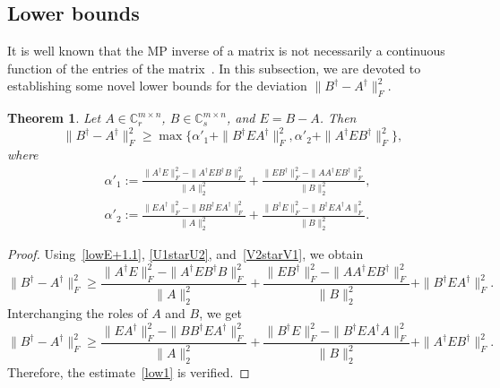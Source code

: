 \documentclass[11pt]{article}
\newtheorem{theorem}{Theorem}[section]
\begin{document}
\subsection{Lower bounds}

\label{subsec:lower}

It is well known that the MP inverse of a matrix is not necessarily a continuous function of the entries of the matrix~\cite{Stewart1969}. In this subsection, we are devoted to establishing some novel lower bounds for the deviation $\|B^{\dagger}-A^{\dagger}\|_{F}^{2}$.

\begin{theorem}\label{low-thm1}
Let $A\in\mathbb{C}^{m\times n}_{r}$, $B\in\mathbb{C}^{m\times n}_{s}$, and $E=B-A$. Then
\begin{equation}\label{low1}
\|B^{\dagger}-A^{\dagger}\|_{F}^{2}\geq\max\big\{\alpha'_{1}+\|B^{\dagger}EA^{\dagger}\|_{F}^{2},\alpha'_{2}+\|A^{\dagger}EB^{\dagger}\|_{F}^{2}\big\},
\end{equation}
where
\begin{align*}
&\alpha'_{1}:=\frac{\|A^{\dagger}E\|_{F}^{2}-\|A^{\dagger}EB^{\dagger}B\|_{F}^{2}}{\|A\|_{2}^{2}}+\frac{\|EB^{\dagger}\|_{F}^{2}-\|AA^{\dagger}EB^{\dagger}\|_{F}^{2}}{\|B\|_{2}^{2}},\\
&\alpha'_{2}:=\frac{\|EA^{\dagger}\|_{F}^{2}-\|BB^{\dagger}EA^{\dagger}\|_{F}^{2}}{\|A\|_{2}^{2}}+\frac{\|B^{\dagger}E\|_{F}^{2}-\|B^{\dagger}EA^{\dagger}A\|_{F}^{2}}{\|B\|_{2}^{2}}.
\end{align*}
\end{theorem}

\begin{proof}
Using~\eqref{lowE+1.1}, \eqref{U1starU2}, and~\eqref{V2starV1}, we obtain
\begin{displaymath}
\|B^{\dagger}-A^{\dagger}\|_{F}^{2}\geq\frac{\|A^{\dagger}E\|_{F}^{2}-\|A^{\dagger}EB^{\dagger}B\|_{F}^{2}}{\|A\|_{2}^{2}}+\frac{\|EB^{\dagger}\|_{F}^{2}-\|AA^{\dagger}EB^{\dagger}\|_{F}^{2}}{\|B\|_{2}^{2}}+\|B^{\dagger}EA^{\dagger}\|_{F}^{2}.
\end{displaymath}
Interchanging the roles of $A$ and $B$, we get
\begin{displaymath}
\|B^{\dagger}-A^{\dagger}\|_{F}^{2}\geq\frac{\|EA^{\dagger}\|_{F}^{2}-\|BB^{\dagger}EA^{\dagger}\|_{F}^{2}}{\|A\|_{2}^{2}}+\frac{\|B^{\dagger}E\|_{F}^{2}-\|B^{\dagger}EA^{\dagger}A\|_{F}^{2}}{\|B\|_{2}^{2}}+\|A^{\dagger}EB^{\dagger}\|_{F}^{2}.
\end{displaymath}
Therefore, the estimate~\eqref{low1} is verified.
\end{proof}
\end{document}
